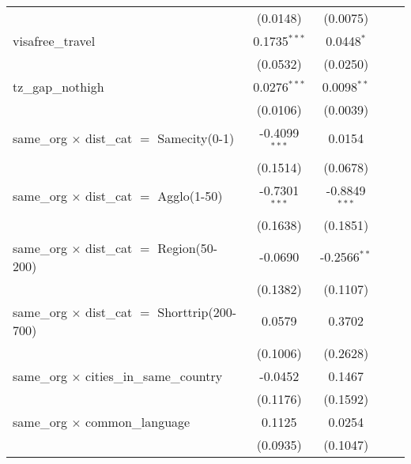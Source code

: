 \begin{tabular}{lcccc}
                                                          & (0.0148)        & (0.0075)        &                 &   \\   
   visafree\_travel                                       & 0.1735$^{***}$  & 0.0448$^{*}$    &                 &   \\   
                                                          & (0.0532)        & (0.0250)        &                 &   \\   
   tz\_gap\_nothigh                                       & 0.0276$^{***}$  & 0.0098$^{**}$   &                 &   \\   
                                                          & (0.0106)        & (0.0039)        &                 &   \\   
   same\_org $\times$ dist\_cat $=$ Samecity(0-1)         & -0.4099$^{***}$ & 0.0154          &                 &   \\   
                                                          & (0.1514)        & (0.0678)        &                 &   \\   
   same\_org $\times$ dist\_cat $=$ Agglo(1-50)           & -0.7301$^{***}$ & -0.8849$^{***}$ &                 &   \\   
                                                          & (0.1638)        & (0.1851)        &                 &   \\   
   same\_org $\times$ dist\_cat $=$ Region(50-200)        & -0.0690         & -0.2566$^{**}$  &                 &   \\   
                                                          & (0.1382)        & (0.1107)        &                 &   \\   
   same\_org $\times$ dist\_cat $=$ Shorttrip(200-700)    & 0.0579          & 0.3702          &                 &   \\   
                                                          & (0.1006)        & (0.2628)        &                 &   \\   
   same\_org $\times$ cities\_in\_same\_country           & -0.0452         & 0.1467          &                 &   \\   
                                                          & (0.1176)        & (0.1592)        &                 &   \\   
   same\_org $\times$ common\_language                    & 0.1125          & 0.0254          &                 &   \\   
                                                          & (0.0935)        & (0.1047)        &                 &   \\   

\end{tabular}
